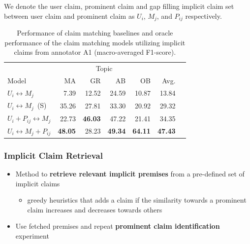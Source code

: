 \documentclass{beamer}
\begin{document}
\begin{frame}

We denote the user claim, prominent claim and gap filling implicit claim set between 
user claim and prominent claim as
$U_i$, $M_j$, and $P_{ij}$ respectively. 

\begin{table}
\begin{center}
{\small
\setlength{\tabcolsep}{5.9pt}
\begin{tabular}{lrrrrrr}
\toprule
&\multicolumn{4}{c}{Topic}\\
\cmidrule(lr){2-5}
Model & MA & GR  & AB & OB & Avg. \\
\midrule
$U_i \leftrightarrow M_j$      & 7.39          & 12.52        & 24.59        & 10.87        & 13.84 \\
$U_i \leftrightarrow M_j$\ (S)  & 35.26         & 27.81        & 33.30        & 20.92        & 29.32 \\
$U_i + P_{ij} \leftrightarrow M_j$   & 22.73         & {\bf 46.03}  & 47.22        & 21.41        & 34.35 \\
$U_i \leftrightarrow M_j + P_{ij} $ & {\bf 48.05}   & 28.23        & {\bf 49.34}  & {\bf 64.11}  & {\bf 47.43} \\
\bottomrule
\end{tabular}}
\caption{Performance of claim matching baselines and oracle performance of the
claim matching models utilizing implicit claims from annotator A1
(macro-averaged F1-score).}
\label{tab:argpremise_matching}
\end{center}
\end{table}

\end{frame}

\begin{frame}
	\frametitle{Implicit Claim Retrieval}

	\begin{itemize}
		\item Method to \textbf{retrieve relevant implicit premises}
			from a pre-defined set of implicit claims
		\begin{itemize}
			\item greedy heuristics that adds a claim if the similarity towards
				a prominent claim increases and decreases towards others
		\end{itemize}
	\item Use fetched premises and repeat \textbf{prominent claim identification} experiment
	\end{itemize}

\end{frame}
\end{document}
